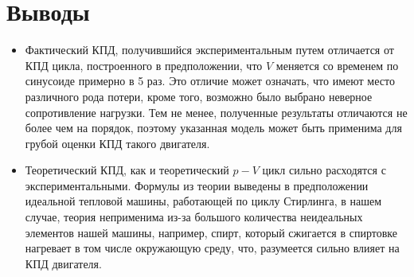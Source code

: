 \documentclass[a4paper,14pt]{extarticle}
\begin{document}
	\section{Выводы}
		\begin{itemize}
			\item Фактический КПД, получившийся экспериментальным путем отличается от КПД цикла, построенного в предположении, что $V$ меняется со временем по синусоиде примерно в 5 раз. Это отличие может означать, что имеют место различного рода потери, кроме того, возможно было выбрано неверное сопротивление нагрузки. Тем не менее, полученные результаты отличаются не более чем на порядок, поэтому указанная модель может быть применима для грубой оценки КПД такого двигателя. 
			\item Теоретический КПД, как и теоретический $p-V$ цикл сильно расходятся с экспериментальными. Формулы из теории выведены в предположении идеальной тепловой машины, работающей по циклу Стирлинга, в нашем случае, теория неприменима из-за большого количества неидеальных элементов нашей машины, например, спирт, который сжигается в спиртовке нагревает в том числе окружающую среду, что, разумеется сильно влияет на КПД двигателя. 
		\end{itemize}
\end{document}
